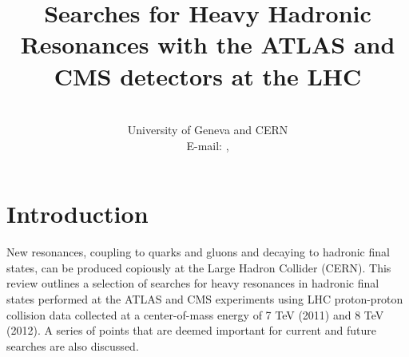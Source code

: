 \documentclass{PoS}
\title{Searches for Heavy Hadronic Resonances with the ATLAS and CMS detectors at the LHC}
\author{\speaker{Caterina Doglioni, Francesco Santanastasio}\\%
        University of Geneva and CERN\\
        E-mail: \email{caterina.doglioni@cern.ch}, \email{francesco.santanastasio@cern.ch}}
\newcommand{\antikt}{anti-$k_t$}
\begin{document}
\section{Introduction}
New resonances, coupling to quarks and gluons and decaying to hadronic final states, 
can be produced copiously at the Large Hadron Collider (CERN). 
This review outlines a selection of searches for heavy resonances in hadronic final states 
performed at the ATLAS and CMS experiments using LHC proton-proton collision data collected 
at a center-of-mass energy of 7 TeV (2011) and 8 TeV (2012). A series of points that 
are deemed important for current and future searches are also discussed.



\end{document}
